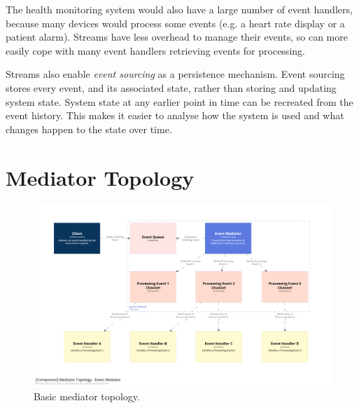 The health monitoring system would also have a large number of event handlers, because many devices would process some events
(e.g. a heart rate display or a patient alarm).
Streams have less overhead to manage their events, so can more easily cope with many event handlers retrieving events for processing. 

Streams also enable \emph{event sourcing} as a persistence mechanism.
Event sourcing stores every event, and its associated state, rather than storing and updating system state.
System state at any earlier point in time can be recreated from the event history.
This makes it easier to analyse how the system is used and what changes happen to the state over time.

%
%


\section{Mediator Topology}

\begin{figure}[h!]
    \begin{adjustwidth}{-10mm}{-10mm}
        \centering
        \includegraphics[trim=195 230 195 162,clip,width=0.97\paperwidth]{diagrams/mediator-components.png}
    \end{adjustwidth}
    \caption{Basic mediator topology.}
    \label{fig:mediator-components}
\end{figure}

